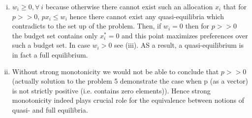 \documentclass[a4paper]{article}
\begin{document}
\begin{enumerate}[(i)]
	\item $w_i \ge 0, \forall\ i$ because otherwise there cannot exist such an allocation $x_i$ that for $p >> 0$, $px_i \le w_i$ hence there cannot exist any quasi-equilibria which contradicts to the set up of the problem. Then, if $w_i = 0$ then for $p >> 0$ the budget set contains only $x_i^* = 0$ and this point maximizes preferences over such a budget set. In case $w_i > 0$ see (iii). AS a result, a quasi-equilibrium is in fact a full equilibrium.
	\item Without strong monotonicity we would not be able to conclude that $p >> 0$ (actually solution to the problem 5 demonstrate the case when p (as a vector) is not strictly positive (i.e. contains zero elements)). Hence strong monotonicity indeed plays crucial role for the equivalence between notions of quasi- and full equilibria.
\end{enumerate}
\end{document}
